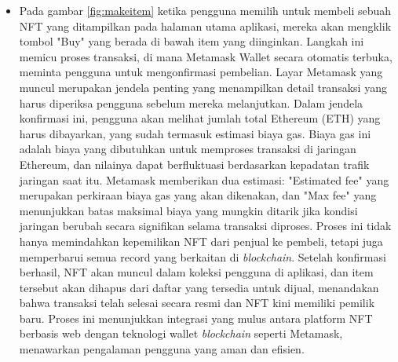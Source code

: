 \begin{itemize}
        \item Pada gambar \ref{fig:makeitem} ketika pengguna memilih untuk membeli sebuah NFT yang ditampilkan pada halaman utama aplikasi, mereka akan mengklik tombol "Buy" yang berada di bawah item yang diinginkan. Langkah ini memicu proses transaksi, di mana Metamask Wallet secara otomatis terbuka, meminta pengguna untuk mengonfirmasi pembelian. Layar Metamask yang muncul merupakan jendela penting yang menampilkan detail transaksi yang harus diperiksa pengguna sebelum mereka melanjutkan. Dalam jendela konfirmasi ini, pengguna akan melihat jumlah total Ethereum (ETH) yang harus dibayarkan, yang sudah termasuk estimasi biaya gas. Biaya gas ini adalah biaya yang dibutuhkan untuk memproses transaksi di jaringan Ethereum, dan nilainya dapat berfluktuasi berdasarkan kepadatan trafik jaringan saat itu. Metamask memberikan dua estimasi: "Estimated fee" yang merupakan perkiraan biaya gas yang akan dikenakan, dan "Max fee" yang menunjukkan batas maksimal biaya yang mungkin ditarik jika kondisi jaringan berubah secara signifikan selama transaksi diproses. Proses ini tidak hanya memindahkan kepemilikan NFT dari penjual ke pembeli, tetapi juga memperbarui semua record yang berkaitan di \emph{blockchain}. Setelah konfirmasi berhasil, NFT akan muncul dalam koleksi pengguna di aplikasi, dan item tersebut akan dihapus dari daftar yang tersedia untuk dijual, menandakan bahwa transaksi telah selesai secara resmi dan NFT kini memiliki pemilik baru. Proses ini menunjukkan integrasi yang mulus antara platform NFT berbasis web dengan teknologi wallet \emph{blockchain} seperti Metamask, menawarkan pengalaman pengguna yang aman dan efisien.
    

\end{itemize}
